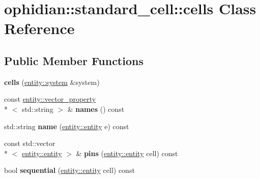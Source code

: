 \hypertarget{classophidian_1_1standard__cell_1_1cells}{\section{ophidian\-:\-:standard\-\_\-cell\-:\-:cells Class Reference}
\label{classophidian_1_1standard__cell_1_1cells}
}
\subsection*{Public Member Functions}
\begin{DoxyCompactItemize}
\item 
\hypertarget{classophidian_1_1standard__cell_1_1cells_a0be18e54479e7b48601c8f63b282f33e}{{\bfseries cells} (\hyperlink{classophidian_1_1entity_1_1system}{entity\-::system} \&system)}\label{classophidian_1_1standard__cell_1_1cells_a0be18e54479e7b48601c8f63b282f33e}

\item 
\hypertarget{classophidian_1_1standard__cell_1_1cells_a6ed7c86ce93e748078f06d3a257eb1df}{const \hyperlink{classophidian_1_1entity_1_1vector__property}{entity\-::vector\-\_\-property}\\*
$<$ std\-::string $>$ \& {\bfseries names} () const }\label{classophidian_1_1standard__cell_1_1cells_a6ed7c86ce93e748078f06d3a257eb1df}

\item 
\hypertarget{classophidian_1_1standard__cell_1_1cells_a7d6d0f875d1f5696f2c2535f87bb3fda}{std\-::string {\bfseries name} (\hyperlink{classophidian_1_1entity_1_1entity}{entity\-::entity} e) const }\label{classophidian_1_1standard__cell_1_1cells_a7d6d0f875d1f5696f2c2535f87bb3fda}

\item 
\hypertarget{classophidian_1_1standard__cell_1_1cells_aac8b33b93e0338608fc41abff3dbfbfe}{const std\-::vector\\*
$<$ \hyperlink{classophidian_1_1entity_1_1entity}{entity\-::entity} $>$ \& {\bfseries pins} (\hyperlink{classophidian_1_1entity_1_1entity}{entity\-::entity} cell) const }\label{classophidian_1_1standard__cell_1_1cells_aac8b33b93e0338608fc41abff3dbfbfe}

\item 
\hypertarget{classophidian_1_1standard__cell_1_1cells_aa9833f973d7fdc669aca0354f617e4cd}{bool {\bfseries sequential} (\hyperlink{classophidian_1_1entity_1_1entity}{entity\-::entity} cell) const }\label{classophidian_1_1standard__cell_1_1cells_aa9833f973d7fdc669aca0354f617e4cd}


\end{DoxyCompactItemize}
